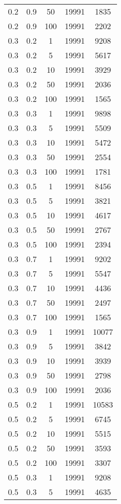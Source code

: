 \begin{appendices}
\begin{longtable}{|c|c|c|c|c|}
		0.2 & 0.9 & 50  & 19991 & 1835  \\
		0.2 & 0.9 & 100 & 19991 & 2202  \\ \hline
		0.3 & 0.2 & 1   & 19991 & 9208  \\
		0.3 & 0.2 & 5   & 19991 & 5617  \\
		0.3 & 0.2 & 10  & 19991 & 3929  \\
		0.3 & 0.2 & 50  & 19991 & 2036  \\
		0.3 & 0.2 & 100 & 19991 & 1565  \\ \hline
		0.3 & 0.3 & 1   & 19991 & 9898  \\
		0.3 & 0.3 & 5   & 19991 & 5509  \\
		0.3 & 0.3 & 10  & 19991 & 5472  \\
		0.3 & 0.3 & 50  & 19991 & 2554  \\
		0.3 & 0.3 & 100 & 19991 & 1781  \\ \hline
		0.3 & 0.5 & 1   & 19991 & 8456  \\
		0.3 & 0.5 & 5   & 19991 & 3821  \\
		0.3 & 0.5 & 10  & 19991 & 4617  \\
		0.3 & 0.5 & 50  & 19991 & 2767  \\
		0.3 & 0.5 & 100 & 19991 & 2394  \\ \hline
		0.3 & 0.7 & 1   & 19991 & 9202  \\
		0.3 & 0.7 & 5   & 19991 & 5547  \\
		0.3 & 0.7 & 10  & 19991 & 4436  \\
		0.3 & 0.7 & 50  & 19991 & 2497  \\
		0.3 & 0.7 & 100 & 19991 & 1565  \\ \hline
		0.3 & 0.9 & 1   & 19991 & 10077 \\
		0.3 & 0.9 & 5   & 19991 & 3842  \\
		0.3 & 0.9 & 10  & 19991 & 3939  \\
		0.3 & 0.9 & 50  & 19991 & 2798  \\
		0.3 & 0.9 & 100 & 19991 & 2036  \\ \hline
		0.5 & 0.2 & 1   & 19991 & 10583 \\
		0.5 & 0.2 & 5   & 19991 & 6745  \\
		0.5 & 0.2 & 10  & 19991 & 5515  \\
		0.5 & 0.2 & 50  & 19991 & 3593  \\
		0.5 & 0.2 & 100 & 19991 & 3307  \\ \hline
		0.5 & 0.3 & 1   & 19991 & 9208  \\
		0.5 & 0.3 & 5   & 19991 & 4635  \\

\end{longtable}
\end{appendices}
